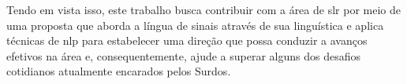 
Tendo em vista isso, este trabalho busca contribuir com a área de \acrfull{slr} por meio de uma proposta que aborda a língua de sinais através de sua linguística e aplica técnicas de \acrfull{nlp} para estabelecer uma direção que possa conduzir a avanços efetivos na área e, consequentemente, ajude a superar alguns dos desafios cotidianos atualmente encarados pelos Surdos.










